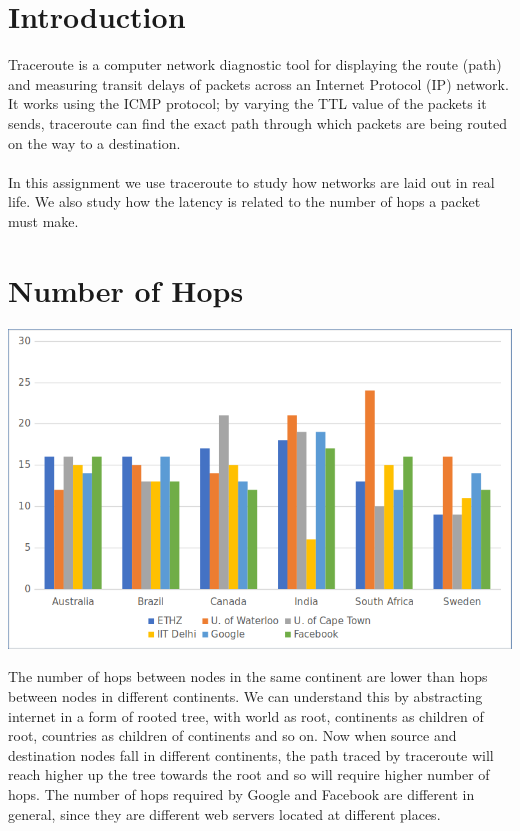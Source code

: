 \documentclass[12pt]{article}
\author{
  Singhal, Madhur\\
  \texttt{2015CS10235}
  \and
  Chhajwani, Anant\\
  \texttt{2015CS50281}
}
\begin{document}
\maketitle


\section{Introduction}
Traceroute is a computer network diagnostic tool for displaying the route (path) and measuring transit delays of packets across an Internet Protocol (IP) network. It works using the ICMP protocol; by varying the TTL value of the packets it sends, traceroute can find the exact path through which packets are being routed on the way to a destination.
\paragraph{}
In this assignment we use traceroute to study how networks are laid out in real life. We also study how the latency is related to the number of hops a packet must make.

\section{Number of Hops}

\begin{center}
\includegraphics[scale=0.76]{ch.png}
\end{center}
The number of hops between nodes in the same continent are lower than hops between nodes
in different continents. We can understand this by abstracting internet in a form of rooted tree,
with world as root, continents as children of root, countries as children of continents and so on. Now when source and destination nodes fall in different continents, the path traced by
traceroute will reach higher up the tree towards the root and so will require higher number of
hops.
The number of hops required by Google and Facebook are different in general, since they are different
web servers located at different places.
\end{document}
